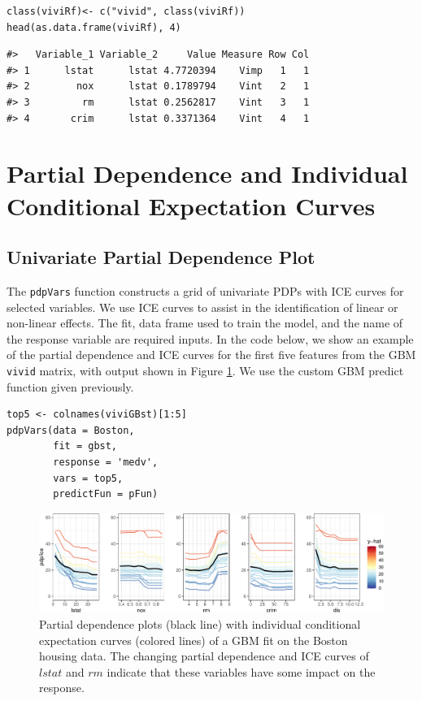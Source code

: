\begin{verbatim}
class(viviRf)<- c("vivid", class(viviRf)) 
head(as.data.frame(viviRf), 4)
\end{verbatim}

\begin{verbatim}
#>   Variable_1 Variable_2     Value Measure Row Col
#> 1      lstat      lstat 4.7720394    Vimp   1   1
#> 2        nox      lstat 0.1789794    Vint   2   1
#> 3         rm      lstat 0.2562817    Vint   3   1
#> 4       crim      lstat 0.3371364    Vint   4   1
\end{verbatim}

\hypertarget{GPDP}{%
\section{Partial Dependence and Individual Conditional Expectation Curves}\label{GPDP}}

\hypertarget{univariate-partial-dependence-plot}{%
\subsection{Univariate Partial Dependence Plot}\label{univariate-partial-dependence-plot}}

The \texttt{pdpVars} function constructs a grid of univariate PDPs with ICE curves for selected variables. We use ICE curves to assist in the identification of linear or non-linear effects. The fit, data frame used to train the model, and the name of the response variable are required inputs. In the code below, we show an example of the partial dependence and ICE curves for the first five features from the GBM \texttt{vivid} matrix, with output shown in Figure \ref{fig:pdpRf}. We use the custom GBM predict function given previously.

\begin{verbatim}
top5 <- colnames(viviGBst)[1:5]
pdpVars(data = Boston,
        fit = gbst,
        response = 'medv',
        vars = top5,
        predictFun = pFun)
\end{verbatim}

\begin{figure}

{\centering \includegraphics[width=1\linewidth]{vivid_files/figure-latex/pdpRf-1} 

}

\caption{Partial dependence plots (black line) with individual conditional expectation curves (colored lines) of a GBM fit on the Boston housing data. The changing partial dependence and ICE curves of $lstat$ and $rm$ indicate that these variables have some impact on the response.}\label{fig:pdpRf}
\end{figure}

